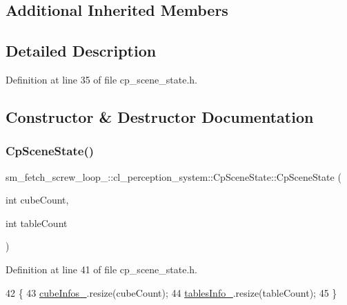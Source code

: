 \subsection*{Additional Inherited Members}


\subsection{Detailed Description}


Definition at line 35 of file cp\+\_\+scene\+\_\+state.\+h.



\subsection{Constructor \& Destructor Documentation}
\mbox{\label{classsm__fetch__screw__loop__1_1_1cl__perception__system_1_1CpSceneState_a020934ddbebe139eb42fe2932e4c8dcc}} 
\subsubsection{\texorpdfstring{Cp\+Scene\+State()}{CpSceneState()}}
{\footnotesize\ttfamily sm\+\_\+fetch\+\_\+screw\+\_\+loop\+\_\+::cl\+\_\+perception\+\_\+system\+::\+Cp\+Scene\+State\+::\+Cp\+Scene\+State (\begin{DoxyParamCaption}\item[{int}]{cube\+Count,  }\item[{int}]{table\+Count }\end{DoxyParamCaption})\hspace{0.3cm}{\ttfamily [inline]}}



Definition at line 41 of file cp\+\_\+scene\+\_\+state.\+h.


\begin{DoxyCode}
42             \{
43                 \hyperlink{classsm__fetch__screw__loop__1_1_1cl__perception__system_1_1CpSceneState_a518bc2132bcc8e88152549db120d7d29}{cubeInfos\_}.resize(cubeCount);
44                 \hyperlink{classsm__fetch__screw__loop__1_1_1cl__perception__system_1_1CpSceneState_adc87f7a438a7030adfaa9e94f0e8f4e0}{tablesInfo\_}.resize(tableCount);
45             \}
\end{DoxyCode}


